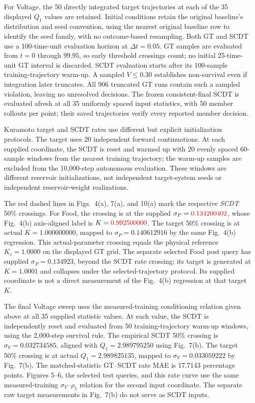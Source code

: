 \documentclass[10pt,a4paper]{article}
\begin{document}
For Voltage, the 50 directly integrated target trajectories at each of the
35 displayed $Q_1$ values are retained. Initial conditions retain the original baseline's
distribution and seed convention, using the nearest original baseline row
to identify the seed family, with no outcome-based resampling. Both GT and
SCDT use a 100-time-unit evaluation horizon at $\Delta t=0.05$. GT samples
are evaluated from $t=0$ through $99.95$, so early threshold crossings count;
no initial 25-time-unit GT interval is discarded. SCDT evaluation starts
after its 100-sample training-trajectory warm-up. A sampled $V\le0.30$
establishes non-survival even if integration later truncates. All 906
truncated GT runs contain such a sampled violation, leaving no unresolved
decisions. The frozen consistent-final SCDT is evaluated afresh at all
35 uniformly spaced input statistics, with 50 member rollouts per point;
their saved trajectories verify every reported member decision.

Kuramoto target
and SCDT rates use different but explicit
initialization protocols. The target uses 20 independent
forward continuations. At each supplied coordinate, the SCDT is reset and warmed up with 20
evenly spaced 60-sample windows from the nearest training trajectory; the
warm-up samples are excluded from the 10,000-step autonomous evaluation. These
windows are different reservoir initializations, not independent target-system
seeds or independent reservoir-weight realizations.

The red dashed lines in Figs.~4(a), 7(a), and 10(a) mark the respective
\emph{SCDT} 50\% crossings. For Food, the crossing is at the supplied
$\sigma_P=\textcolor{red}{0.134200402}$, whose Fig.~4(b) axis-aligned label is
$K=\textcolor{red}{0.992500000}$. The target 50\%
crossing is at actual $K=1.000000000$, mapped to $\sigma_P=0.140612916$
by the same Fig.~4(b) regression. This actual-parameter crossing equals
the physical reference $K_c=1.0000$ on the displayed GT grid.
The separate selected Food post query has supplied $\sigma_P=0.134923$,
beyond the SCDT rate crossing; its target is generated at $K=1.0001$ and
collapses under the selected-trajectory protocol. Its supplied coordinate
is not a direct measurement of the Fig.~4(b) regression at that target $K$.

The final Voltage sweep uses the measured-training conditioning relation given above
at all 35 supplied statistic values. At each value, the SCDT is independently reset and
evaluated from 50 training-trajectory warm-up windows, using the 2,000-step
survival rule. The empirical SCDT 50\% crossing is
$\sigma_V=0.032734585$, aligned with $Q_1=2.989795250$ using Fig.~7(b).
The target 50\% crossing is at actual $Q_1=2.989825135$, mapped to
$\sigma_V=0.033059222$ by Fig.~7(b). The matched-statistic
GT--SCDT rate MAE is 17.7143 percentage points. Figures 5--6, the selected test queries, and this rate curve use the same
measured-training $\sigma_V$--$\rho_1$ relation for the second input
coordinate. The separate raw target measurements in Fig.~7(b) do not
serve as SCDT inputs.
\end{document}

